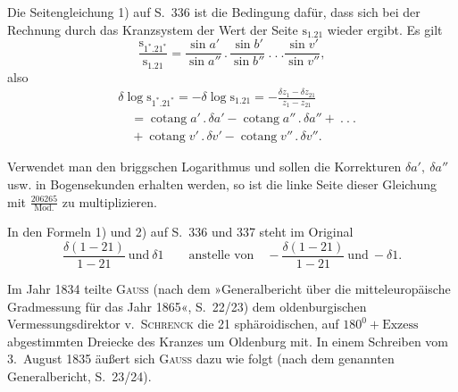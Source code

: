 \par\noindent\hspace*{\parindent}Die Seitengleichung 1) auf S.~336 ist die Bedingung dafür, dass sich bei der Rechnung durch das Kranzsystem der Wert der Seite \(\mathrm{s}_{1.21}\) wieder ergibt. Es gilt
\[
\frac{\mathrm{s}_{1^*.21^*}}{\mathrm{s}_{1.21}}=\frac{\sin a'}{\sin a''}\,.\,\frac{\sin b'}{\sin b''}\ .\ .\ .\frac{\sin v'}{\sin v''},
\]
\noindent also
\[
\begin{aligned}
&\delta\log\mathrm{s}_{1^*.21^*}=-\delta\log\mathrm{s}_{1.21}=-\frac{\delta z_1-\delta z_{21}}{z_1-z_{21}}\\
&\quad=\operatorname{cotang}a'\,.\,\delta a'-\operatorname{cotang}a''\,.\,\delta a''+\ .\ .\ .\\
&\quad+\operatorname{cotang}v'\,.\,\delta v'-\operatorname{cotang}v''\,.\,\delta v''.
\end{aligned}
\]
\par\noindent\hspace*{\parindent}Verwendet man den briggschen Logarithmus und sollen die Korrekturen \(\delta a',\ \delta a''\) usw. in Bogensekunden erhalten werden, so ist die linke Seite dieser Gleichung mit \(\frac{206265}{\mathrm{Mod.}}\) zu multiplizieren.

\par\noindent\hspace*{\parindent}In den Formeln 1) und 2) auf S.~336 und 337 steht im Original
\[
\frac{\delta(1-21)}{1-21}\ \text{und}\ \delta1\qquad\text{anstelle von}\quad-\frac{\delta(1-21)}{1-21}\ \text{und}\ -\delta1.
\]
\par\noindent\hspace*{\parindent}Im Jahr 1834 teilte \textsc{Gauss} (nach dem »Generalbericht über die mitteleuropäische Gradmessung für das Jahr 1865«, S.~22/23) dem oldenburgischen Vermessungsdirektor v.~\textsc{Schrenck} die 21 sphäroidischen, auf \(180^0+\text{Exzess}\) abgestimmten Dreiecke des Kranzes um Oldenburg mit. In einem Schreiben vom 3.~August 1835 äußert sich \textsc{Gauss} dazu wie folgt (nach dem genannten Generalbericht, S.~23/24).

